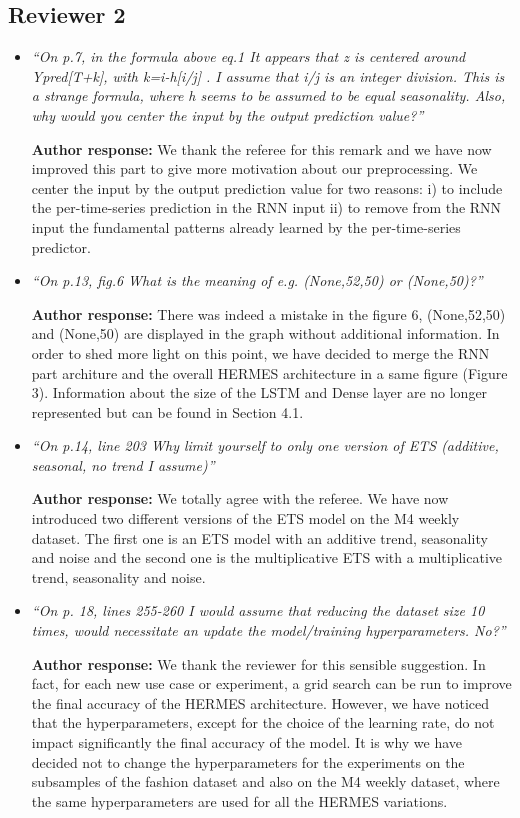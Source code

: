 \documentclass[11pt]{article}
\begin{document}
\subsection*{Reviewer 2}
\begin{itemize}

\item {\em ``On p.7, in the formula above eq.1 It appears that z is centered around Ypred[T+k], with k=i-h[i/j] . I assume that i/j is an integer division. This is a strange formula, where h seems to be assumed to be equal seasonality. Also, why would you center the input by the output prediction value?''} \medskip

\textbf{Author response:} We thank the referee for this remark and we have now improved this part to give more motivation about our preprocessing. We center the input by the output prediction value for two reasons: i) to include the per-time-series prediction in the RNN input ii) to remove from the RNN input the fundamental patterns already learned by the per-time-series predictor.

\item {\em ``On p.13, fig.6 What is the meaning of e.g. (None,52,50) or (None,50)?''} \medskip

\textbf{Author response:} There was indeed a mistake in the figure 6, (None,52,50) and (None,50) are displayed in the graph without additional information. In order to shed more light on this point, we have decided to merge the RNN part architure and the overall HERMES architecture in a same figure (Figure 3). Information about the size of the LSTM and Dense layer are no longer represented but can be found in Section 4.1. 

\item {\em ``On p.14, line 203 Why limit yourself to only one version of ETS (additive, seasonal, no trend I assume)''} \medskip

\textbf{Author response:} We totally agree with the referee. We have now introduced two different versions of the ETS model on the M4 weekly dataset. The first one is an ETS model with an additive trend, seasonality and noise and the second one is the multiplicative ETS with a multiplicative trend, seasonality and noise.

\item {\em ``On p. 18, lines 255-260 I would assume that reducing the dataset size 10 times, would necessitate an update the model/training hyperparameters. No?''} \medskip

\textbf{Author response:} We thank the reviewer for this sensible suggestion. In fact, for each new use case or experiment, a grid search can be run to improve the final accuracy of the HERMES architecture. However, we have noticed that the hyperparameters, except for the choice of the learning rate, do not impact significantly the final accuracy of the model. It is why we have decided not to change the hyperparameters for the experiments on the subsamples of the fashion dataset and also on the M4 weekly dataset, where the same hyperparameters are used for all the HERMES variations. 


\end{itemize}
\end{document}
